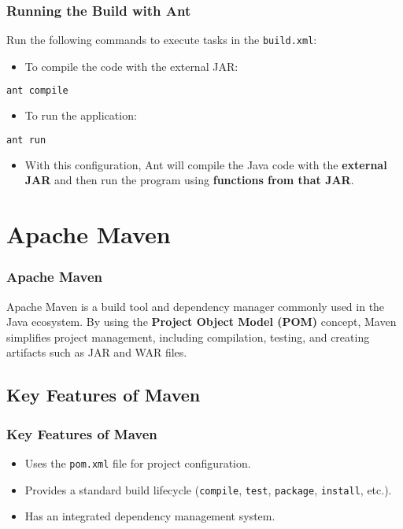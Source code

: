 \documentclass[aspectratio=169, table]{beamer}
\begin{document}
\begin{frame}[fragile]
	\frametitle{Running the Build with Ant}
	Run the following commands to execute tasks in the \texttt{build.xml}:
	\begin{itemize}
		\item To compile the code with the external JAR:
	\end{itemize}
	\begin{lstlisting}[language=bash]
		ant compile
	\end{lstlisting}
	\begin{itemize}
		\item To run the application:
	\end{itemize}
	\begin{lstlisting}[language=bash]
		ant run
	\end{lstlisting}
	\begin{itemize}
		\item With this configuration, Ant will compile the Java code with the \textbf{external JAR} and then run the program using \textbf{functions from that JAR}.
	\end{itemize}
\end{frame}



\section{Apache Maven}
\begin{frame}
	\frametitle{Apache Maven}
	Apache Maven is a build tool and dependency manager commonly used in the Java ecosystem. By using the \textbf{Project Object Model (POM)} concept, Maven simplifies project management, including compilation, testing, and creating artifacts such as JAR and WAR files.
\end{frame}

\subsection{Key Features of Maven}
\begin{frame}
	\frametitle{Key Features of Maven}
	\begin{itemize}
		\item Uses the \texttt{pom.xml} file for project configuration.
		\item Provides a standard build lifecycle (\texttt{compile}, \texttt{test}, \texttt{package}, \texttt{install}, etc.).
		\item Has an integrated dependency management system.
	\end{itemize}
\end{frame}
\end{document}
